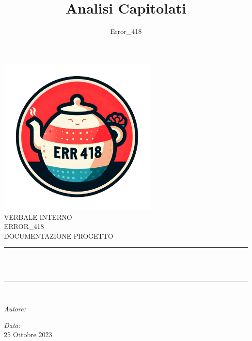 \documentclass[a4paper, twoside]{article}
\title{\Huge Analisi Capitolati}
\author{Error\_418}
\newcommand{\HRule}{\rule{\linewidth}{0.5mm}}
\begin{document}
\sffamily
\begin{titlepage}
\centering
\includegraphics[width=8cm]{./logo.png}\\[1.5cm]
\center %
\textsf{\Huge VERBALE INTERNO}\\[2cm]
\textsf{\Large ERROR\_418}\\[0.5cm]
\textsf{\Large DOCUMENTAZIONE PROGETTO}\\[0.5cm]
\makeatletter
\HRule \\[0.4cm]
{ \huge \bfseries \@title}\\[0.4cm]
\HRule \\[1.5cm]
\begin{minipage}{0.4\textwidth}
\begin{flushleft} \large
\emph{Autore:}\\
\@author %
\end{flushleft}
\end{minipage}
\begin{minipage}{0.4\textwidth}
\begin{flushright} \large
\emph{Data:}\\
{\large 25 Ottobre 2023}\\[1cm]
\end{flushright}
\end{minipage}


\end{titlepage}
\end{document}
